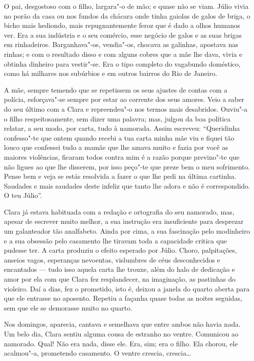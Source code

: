 O pai, desgostoso com o filho, largara"-o de mão; e quase não se viam.
Júlio vivia no porão da casa ou nos fundos da chácara onde tinha gaiolas
de galos de briga, o bicho mais hediondo, mais repugnantemente feroz que
é dado a olhos humanos ver. Era a sua indústria e o seu comércio, esse
negócio de galos e as suas brigas em rinhadeiros. Barganhava"-os,
vendia"-os, chocava as galinhas, apostava nas rinhas; e com o resultado
disso e com alguns cobres que a mãe lhe dava, vivia e obtinha dinheiro
para vestir"-se. Era o tipo completo do vagabundo doméstico, como há
milhares nos subúrbios e em outros bairros do Rio de Janeiro.

A mãe, sempre temendo que se repetissem os seus ajustes de contas com a
polícia, esforçava"-se sempre por estar ao corrente dos seus amores. Veio
a saber do seu último com a Clara e repreendeu"-o nos termos mais
desabridos. Ouviu"-a o filho respeitosamente, sem dizer uma palavra; mas,
julgou da boa política relatar, a seu modo, por carta, tudo à namorada.
Assim escreveu: ``Queridinha confesso"-te que ontem quando recebi a tua
carta minha mãe viu e fiquei tão louco que confessei tudo a mamãe que
lhe amava muito e fazia por você as maiores violências, ficaram todos
contra mim é a razão porque previno"-te que não ligues ao que lhe
disserem, por isso peço"-te que preze bem o meu sofrimento. Pense bem e
veja se estás resolvida a fazer o que lhe pedi na última cartinha.
Saudades e mais saudades deste infeliz que tanto lhe adora e não é
correspondido. O teu Júlio''.

Clara já estava habituada com a redação e ortografia do seu namorado,
mas, apesar de escrever muito melhor, a sua instrução era insuficiente
para desprezar um galanteador tão analfabeto. Ainda por cima, a sua
fascinação pelo modinheiro e a sua obsessão pelo casamento lhe tiravam
toda a capacidade critica que pudesse ter. A carta produziu o efeito
esperado por Júlio. Choro, palpitações, anseios vagos, esperanças
nevoentas, vislumbres de céus desconhecidos e encantados --- tudo isso
aquela carta lhe trouxe, além do halo de dedicação e amor por ela com
que Clara fez resplandecer, na imaginação, as pastinhas do violeiro. Daí
a dias, fez o prometido, isto é, deixou a janela do quarto aberta para
que ele entrasse no aposento. Repetiu a façanha quase todas as noites
seguidas, sem que ele se demorasse muito no quarto.

Nos domingos, aparecia, cantava e semelhava que entre ambos não havia
nada. Um belo dia, Clara sentiu alguma cousa de estranho no ventre.
Comunicou ao namorado. Qual! Não era nada, disse ele. Era, sim; era o
filho. Ela chorou, ele acalmou"-a, prometendo casamento. O ventre
crescia, crescia\ldots{}

